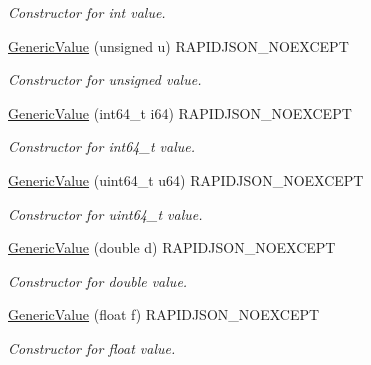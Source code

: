 \begin{DoxyCompactItemize}
\begin{DoxyCompactList}\small\item\em Constructor for int value. \end{DoxyCompactList}\item 
\mbox{\label{a01992_a972bff6c56ac3d04622ff7fad8d98331}} 
\hyperlink{a01992_a972bff6c56ac3d04622ff7fad8d98331}{Generic\+Value} (unsigned u) R\+A\+P\+I\+D\+J\+S\+O\+N\+\_\+\+N\+O\+E\+X\+C\+E\+PT
\begin{DoxyCompactList}\small\item\em Constructor for unsigned value. \end{DoxyCompactList}\item 
\mbox{\label{a01992_a964b69f1d2596f75ded5421b6db01a14}} 
\hyperlink{a01992_a964b69f1d2596f75ded5421b6db01a14}{Generic\+Value} (int64\+\_\+t i64) R\+A\+P\+I\+D\+J\+S\+O\+N\+\_\+\+N\+O\+E\+X\+C\+E\+PT
\begin{DoxyCompactList}\small\item\em Constructor for int64\+\_\+t value. \end{DoxyCompactList}\item 
\mbox{\label{a01992_ad04805a57f5050c8e04be469ba64d6f3}} 
\hyperlink{a01992_ad04805a57f5050c8e04be469ba64d6f3}{Generic\+Value} (uint64\+\_\+t u64) R\+A\+P\+I\+D\+J\+S\+O\+N\+\_\+\+N\+O\+E\+X\+C\+E\+PT
\begin{DoxyCompactList}\small\item\em Constructor for uint64\+\_\+t value. \end{DoxyCompactList}\item 
\mbox{\label{a01992_a267d05b7e98c3507908eaf085fe41155}} 
\hyperlink{a01992_a267d05b7e98c3507908eaf085fe41155}{Generic\+Value} (double d) R\+A\+P\+I\+D\+J\+S\+O\+N\+\_\+\+N\+O\+E\+X\+C\+E\+PT
\begin{DoxyCompactList}\small\item\em Constructor for double value. \end{DoxyCompactList}\item 
\mbox{\label{a01992_acad11ab781251634a3c079aa64a6d283}} 
\hyperlink{a01992_acad11ab781251634a3c079aa64a6d283}{Generic\+Value} (float f) R\+A\+P\+I\+D\+J\+S\+O\+N\+\_\+\+N\+O\+E\+X\+C\+E\+PT
\begin{DoxyCompactList}\small\item\em Constructor for float value. \end{DoxyCompactList}\item 

\end{DoxyCompactItemize}
